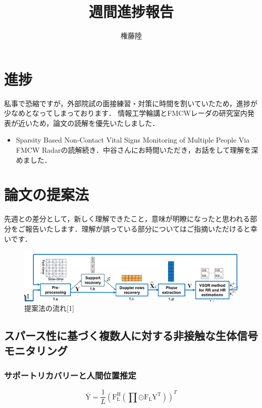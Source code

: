 \documentclass[dvipdfmx]{jsarticle}
\begin{document}
\title{週間進捗報告}
\author{権藤陸}
\maketitle
\section{進捗}
私事で恐縮ですが，外部院試の面接練習・対策に時間を割いていたため，進捗が少なめとなってしまっております．
情報工学輪講とFMCWレーダの研究室内発表が近いため，論文の読解を優先いたしました．

\begin{itemize}
    \item Sparsity Based Non-Contact Vital Signs Monitoring of Multiple People Via FMCW Radarの読解続き．中谷さんにお時間いただき，お話をして理解を深めました．
\end{itemize}

\section{論文の提案法}
先週との差分として，新しく理解できたこと，意味が明瞭になったと思われる部分をご報告いたします．理解が誤っている部分についてはご指摘いただけると幸いです．
\begin{figure}[htbp]
\begin{center}
\includegraphics[width=\linewidth]{./img/NCVSM_diagram.png}
\end{center}
\caption{提案法の流れ[1]}
\end{figure}

\subsection{スパース性に基づく複数人に対する非接触な生体信号モニタリング}
\subsubsection{サポートリカバリーと人間位置推定}
\begin{equation}\label{}
\bar{\mathrm{Y}} = \frac{1}{L}(\mathrm{F^H_L} (\prod \odot \mathrm{F_L Y^T}))^T
\end{equation}
\end{document}
